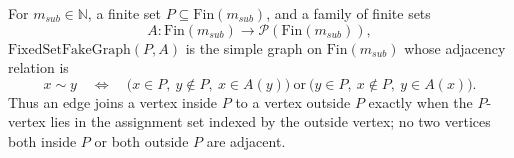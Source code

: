 \begin{definition}
For \(m_{sub}\in\mathbb N\), a finite set
\(P\subseteq\mathrm{Fin}(m_{sub})\), and a family of finite sets
\[
A:\mathrm{Fin}(m_{sub})\to\mathcal P(\mathrm{Fin}(m_{sub})),
\]
\(\mathrm{FixedSetFakeGraph}(P,A)\) is the simple graph on
\(\mathrm{Fin}(m_{sub})\) whose adjacency relation is
\[
x\sim y
\quad\Longleftrightarrow\quad
\bigl(x\in P,\ y\notin P,\ x\in A(y)\bigr)
\ \text{or}\
\bigl(y\in P,\ x\notin P,\ y\in A(x)\bigr).
\]
Thus an edge joins a vertex inside \(P\) to a vertex outside \(P\) exactly
when the \(P\)-vertex lies in the assignment set indexed by the outside
vertex; no two vertices both inside \(P\) or both outside \(P\) are adjacent.
\end{definition}
